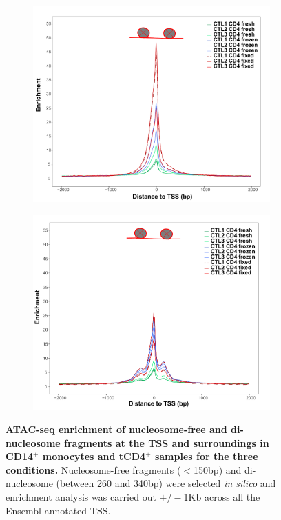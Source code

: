 \begin{figure}[H]
~
\begin{subfigure}[b]{0.45\textwidth} 
\centering
\includegraphics[width=\textwidth]{./Results1/pdfs/Core_ATAC_CD4_fresh_frozen_fixed_internucleosome_TSS}%
\caption{}
\end{subfigure}
\begin{subfigure}[b]{0.45\textwidth} 
\centering
\includegraphics[width=\textwidth]{./Results1/pdfs/Core_ATAC_CD4_fresh_frozen_fixed_dinucleosome_TSS}%
\caption{}
\end{subfigure}
\caption[ATAC-seq enrichment of nucleosome-free and di-nucleosome fragments at the TSS and surroundings in CD14$^+$ monocytes and tCD4$^+$ samples for the three conditions.]{\textbf{ATAC-seq enrichment of nucleosome-free and di-nucleosome fragments at the TSS and surroundings in CD14$^+$ monocytes and tCD4$^+$ samples for the three conditions.} Nucleosome-free fragments ($<$150bp) and di-nucleosome (between 260 and 340bp) were selected \textit{in silico} and enrichment analysis was carried out $+/-$1Kb across all the Ensembl annotated TSS.}
\label{figure:Core_ATAC_intra_dinucleosome_tss_enrichment}
\end{figure}


